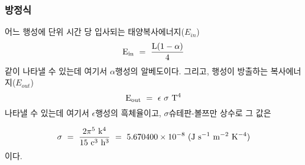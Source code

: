 \subsubsection{방정식}\index{}


어느 행성에 단위 시간 당 입사되는 태양복사에너지($E_{in}$)\는 
\begin{equation}
{\rm E_{in} ~ = ~ \frac{L (1- \alpha)} {4}}
\label{eq:001}
\end{equation}
\와 같이 나타낼 수 있는데 여기서 ${\alpha}$\는 행성의 알베도이다. 그리고, 행성이 방출하는 복사에너지($E_{out}$)\는 
\begin{equation}
{\rm E_{out} ~ = ~ {\epsilon} ~ {\sigma} ~ T^4}
\label{eq:002}
\end{equation}
\로 나타낼 수 있는데 여기서 ${\epsilon}$\은 행성의 흑체율이고, ${\sigma}$\는 슈테판-볼쯔만 상수로 그 값은

\begin{equation}%
{\rm \sigma ~ =~ \frac{2\pi^5~k^4}{15~c^3~h^3}~=~ 5.670400 \times 10^{-8}~ (J ~s^{-1}~m^{-2}~K^{-4})}
\end{equation}
이다. 


